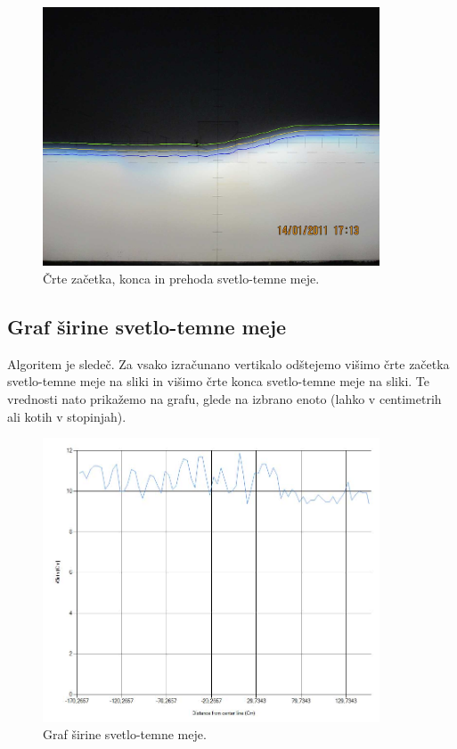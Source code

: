 \documentclass[oneside, a4paper, 12pt]{book}
\begin{document}
\begin{figure}
\begin{center}
\includegraphics[width=10cm]{slike/svetlo-temna-meja-po-celi-sirini.jpg}
\end{center}
\caption{Črte začetka, konca in prehoda svetlo-temne meje.}
\label{pic:svet-tem3}
\end{figure}

\subsection{Graf širine svetlo-temne meje}
Algoritem je sledeč. Za vsako izračunano vertikalo odštejemo višimo črte začetka svetlo-temne meje na sliki in višimo črte konca svetlo-temne meje na sliki. Te vrednosti nato prikažemo na grafu, glede na izbrano enoto (lahko v centimetrih ali kotih v stopinjah).

\begin{figure}
\begin{center}
\includegraphics[width=10cm]{slike/graf-sirina-s-t-meja.jpg}
\end{center}
\caption{Graf širine svetlo-temne meje.}
\label{pic:st-sirina}
\end{figure}
\end{document}
